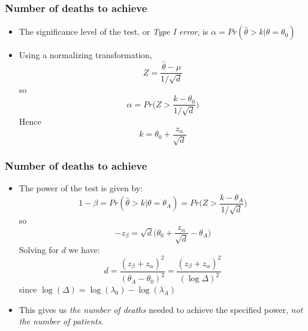 \documentclass{beamer}
\newcommand{\empr}[1]{{\emph{\color{red}#1}}}
\begin{document}
\pagebreak
\begin{frame}
\frametitle{Number of deaths to achieve}
\begin{itemize}
\item The significance level of the test, or \empr{Type I error}, is $\alpha = Pr(\hat{\theta}>k|\theta = \theta_0)$
\item Using a normalizing transformation,
\begin{equation}
Z = \frac{\hat{\theta}-\mu}{1/\sqrt{d}}
\end{equation}
so
\begin{equation}
\alpha = Pr\bigg( Z>\frac{k-\theta_0}{1/\sqrt{d}}\bigg)
\end{equation}
Hence
\begin{equation}
k = \theta_0 + \frac{z_\alpha}{\sqrt{d}}
\end{equation}
\end{itemize}
\end{frame}


\pagebreak
\begin{frame}
\frametitle{Number of deaths to achieve}
\begin{itemize}
\item The power of the test is given by:
\begin{equation}
1-\beta = Pr(\hat{\theta}>k|\theta = \theta_A) = Pr\bigg( Z>\frac{k-\theta_A}{1/\sqrt{d}}\bigg)
\end{equation}
so
\begin{equation}
-z_{\beta} = \sqrt{d} \bigg( \theta_0+ \frac{z_\alpha}{\sqrt{d}} - \theta_A\bigg)
\end{equation}
Solving for $d$ we have:
\begin{equation}
d = \frac{(z_{\beta} +z_{\alpha})^2}{(\theta_A - \theta_0)^2} = \frac{(z_{\beta} +z_{\alpha})^2}{(\log \Delta)^2}
\end{equation}
since $\log(\Delta) = \log(\lambda_0) - \log(\lambda_A)$
\item This gives us \empr{the number of deaths} needed to achieve the specified power, \empr{not the number of patients}.
\end{itemize}
\end{frame}
\end{document}
